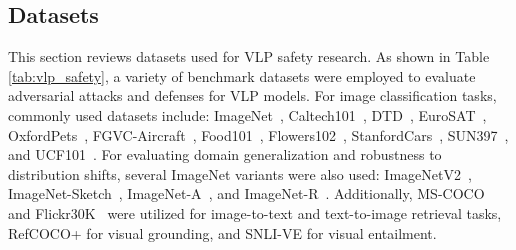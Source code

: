 \subsection{Datasets}
\label{sec:vlp-data}
This section reviews datasets used for VLP safety research. As shown in Table \ref{tab:vlp_safety}, a variety of benchmark datasets were employed to evaluate adversarial attacks and defenses for VLP models. For image classification tasks, commonly used datasets include: ImageNet~\cite{russakovsky2015imagenet}, Caltech101~\cite{fei2004learning}, DTD~\cite{cimpoi2014describing}, EuroSAT~\cite{helber2019eurosat}, OxfordPets~\cite{parkhi2012cats}, FGVC-Aircraft~\cite{maji2013fine}, Food101~\cite{bossard2014food}, Flowers102~\cite{nilsback2008automated}, StanfordCars~\cite{krause20133d}, SUN397~\cite{xiao2010sun}, and UCF101~\cite{soomro2012ucf101}. 
For evaluating domain generalization and robustness to distribution shifts, several ImageNet variants were also used: ImageNetV2~\cite{recht2019imagenet}, ImageNet-Sketch~\cite{wang2019learning}, ImageNet-A~\cite{hendrycks2021natural}, and ImageNet-R~\cite{hendrycks2021many}. Additionally, MS-COCO~\cite{lin2014microsoft} and Flickr30K~\cite{plummer2015flickr30k} were utilized for image-to-text and text-to-image retrieval tasks, RefCOCO+\cite{yu2016modeling} for visual grounding, and SNLI-VE\cite{xie2019visual} for visual entailment.




